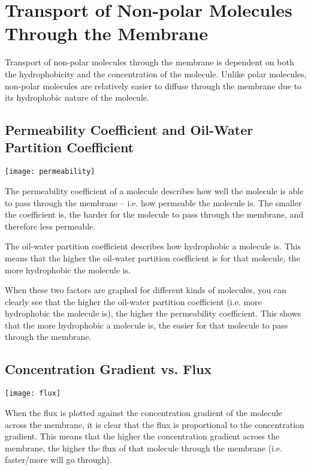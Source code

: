 \section{Transport of Non-polar Molecules Through the Membrane}

Transport of non-polar molecules through the membrane is dependent on both the hydrophobicity and the concentration of the molecule.
Unlike polar molecules, non-polar molecules are relatively easier to diffuse through the membrane due to its hydrophobic nature of the molecule.

\subsection{Permeability Coefficient and Oil-Water Partition Coefficient}

\begin{center}
\texttt{[image: permeability]}
\end{center}

The permeability coefficient of a molecule describes how well the molecule is able to pass through the membrane -- i.e. how permeable the molecule is.
The smaller the coefficient is, the harder for the molecule to pass through the membrane, and therefore less permeable.

The oil-water partition coefficient describes how hydrophobic a molecule is.
This means that the higher the oil-water partition coefficient is for that molecule, the more hydrophobic the molecule is.

When these two factors are graphed for different kinds of molecules, you can clearly see that the higher the oil-water partition coefficient (i.e. more hydrophobic the molecule is), the higher the permeability coefficient.
This shows that the more hydrophobic a molecule is, the easier for that molecule to pass through the membrane.

\subsection{Concentration Gradient vs. Flux}

\begin{center}
\texttt{[image: flux]}
\end{center}

When the  flux  is plotted against the concentration gradient of the molecule across the membrane, it is clear that the flux is proportional to the concentration gradient.
This means that the higher the concentration gradient across the membrane, the higher the flux of that molecule through the membrane (i.e. faster/more will go through).

